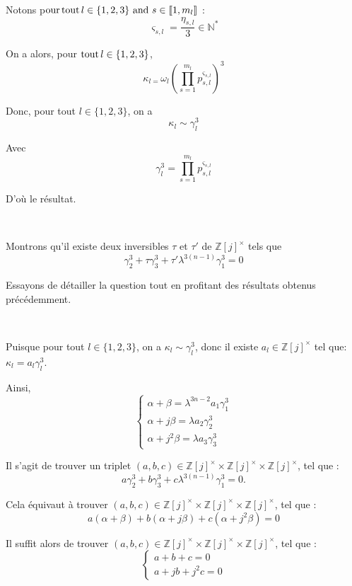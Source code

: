 Notons p$\operatorname{our} \operatorname{tout} l \in \{ 1, 2, 3 \}  \text{ and } s \in
\llbracket 1, m_l \rrbracket$ :
\[ \varsigma_{s, l} = \frac{\eta_{s, l}}{3} \in \mathbb{N}^{\ast} \]


On a alors, pour $\operatorname{tout} l \in \{ 1, 2, 3 \}$,
\[ \kappa_{l =} \omega_l \left( \underset{s = 1}{\overset{m_l}{\prod}}
   p^{\varsigma_{s, l}}_{s, l} \right)^3 \]


Donc, pour tout $l \in \{ 1, 2, 3 \}$, on a
\[ \kappa_l \sim \gamma_l^3 \]


Avec
\[ \gamma_l^3 = \underset{s = 1}{\overset{m_l}{\prod}} p^{\varsigma_{s,
   l}}_{s, l} \]


D'o{\`u} le r{\'e}sultat.

\

 Montrons qu'il existe deux inversibles $\tau$ et $\tau'$ de
$\mathbb{Z} [j]^{\times}$ tels que
\[ \gamma^3_2 + \tau \gamma^3_3 + \tau' \lambda^{3 (n - 1)} \gamma^3_1 = 0 \]


Essayons de d{\'e}tailler la question tout en profitant des r{\'e}sultats
obtenus pr{\'e}c{\'e}demment.

\

Puisque pour tout $l \in \{ 1, 2, 3 \}$, on a $\kappa_l \sim \gamma^3_l$,
donc il existe $a_l \in \mathbb{Z} [j]^{\times}$ tel que: $\kappa_l = a_l
\gamma^3_l$.

Ainsi,
\[ \left\{\begin{array}{l}
     \alpha + \beta = \lambda^{3 n - 2} a_1 \gamma^3_1\\
     \alpha + j \beta = \lambda a_2 \gamma^3_2\\
     \alpha + j^2 \beta = \lambda a_3 \gamma^3_3
   \end{array}\right. \]


Il s'agit de trouver un triplet $(a, b, c) \in \mathbb{Z} [j]^{\times} \times
\mathbb{Z} [j]^{\times} \times \mathbb{Z} [j]^{\times}$, tel que :
\[ a \gamma^3_2 + b \gamma^3_3 + c \lambda^{3 (n - 1)} \gamma^3_1 = 0. \]


Cela {\'e}quivaut {\`a} trouver $(a, b, c) \in \mathbb{Z} [j]^{\times} \times
\mathbb{Z} [j]^{\times} \times \mathbb{Z} [j]^{\times}$, tel que :
\[ a (\alpha + \beta) + b (\alpha + j \beta) + c (\alpha + j^2 \beta) = 0 \]


Il suffit alors de trouver  $(a, b, c) \in \mathbb{Z} [j]^{\times} \times
\mathbb{Z} [j]^{\times} \times \mathbb{Z} [j]^{\times}$, tel que :
\[ \left\{\begin{array}{l}
     a + b + c = 0\\
     a + j b + j^2 c = 0
   \end{array}\right. \]


